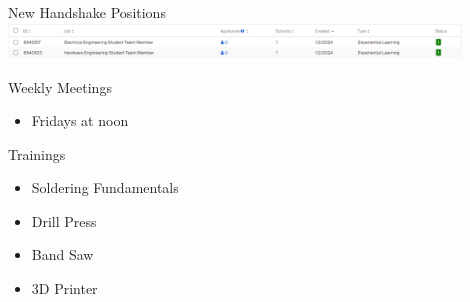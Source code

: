 \begin{frame}{New Handshake Positions}
    \centering
    \includegraphics[height=0.7\textheight,width=0.9\textwidth,keepaspectratio]{Screenshot 2024-01-02 163339.png}
\end{frame}
\begin{frame}{Weekly Meetings}
    \begin{itemize}
        \item Fridays at noon
    \end{itemize}
\end{frame}
\begin{frame}{Trainings}
    \begin{itemize}
        \item Soldering Fundamentals
        \item Drill Press
        \item Band Saw
        \item 3D Printer
    \end{itemize}
\end{frame}